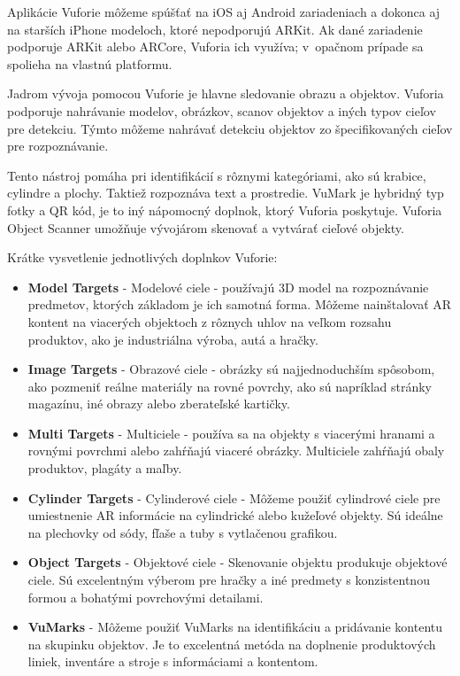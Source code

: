 Aplikácie Vuforie môžeme spúšťať na iOS aj Android zariadeniach a dokonca aj na starších iPhone modeloch, ktoré nepodporujú ARKit. Ak dané zariadenie podporuje ARKit alebo ARCore, Vuforia ich využíva; v~opačnom prípade sa spolieha na vlastnú platformu.

Jadrom vývoja pomocou Vuforie je hlavne sledovanie obrazu a objektov. Vuforia podporuje nahrávanie modelov, obrázkov, scanov objektov a iných typov cieľov pre detekciu. Týmto môžeme nahrávať detekciu objektov zo špecifikovaných cieľov pre rozpoznávanie.

Tento nástroj pomáha pri identifikácií s rôznymi kategóriami, ako sú krabice, cylindre a plochy. Taktiež rozpoznáva text a prostredie. VuMark je hybridný typ fotky a QR kód, je to iný nápomocný doplnok, ktorý Vuforia poskytuje. Vuforia Object Scanner umožňuje vývojárom skenovať a vytvárať cieľové objekty. 

Krátke vysvetlenie jednotlivých doplnkov Vuforie:

\begin{itemize}
    \item \textbf{Model Targets} - Modelové ciele - používajú 3D model na rozpoznávanie predmetov, ktorých základom je ich samotná forma. Môžeme nainštalovať AR kontent na viacerých objektoch z rôznych uhlov na veľkom rozsahu produktov, ako je industriálna výroba, autá a hračky.
    
    \item \textbf{Image Targets} - Obrazové ciele - obrázky sú najjednoduchším spôsobom, ako pozmeniť reálne materiály na rovné povrchy, ako sú napríklad stránky magazínu, iné obrazy alebo zberateľské kartičky.
    
    \item \textbf{Multi Targets} - Multiciele - používa sa na objekty s viacerými hranami a rovnými povrchmi alebo zahŕňajú viaceré obrázky. Multiciele zahŕňajú obaly produktov, plagáty a maľby.
    
    \item \textbf{Cylinder Targets} - Cylinderové ciele -  Môžeme použiť cylindrové ciele pre umiestnenie AR informácie na cylindrické alebo kužeľové objekty. Sú ideálne na plechovky od sódy, fľaše a tuby s vytlačenou grafikou.
    
    \item \textbf{Object Targets} - Objektové ciele - Skenovanie objektu produkuje objektové ciele. Sú excelentným výberom pre hračky a iné predmety s konzistentnou formou a bohatými povrchovými detailami. 
    
    \item \textbf{VuMarks} - Môžeme použiť VuMarks na identifikáciu a pridávanie kontentu na skupinku objektov. Je to excelentná metóda na doplnenie produktových liniek, inventáre a stroje s informáciami a kontentom. 
\end{itemize}

